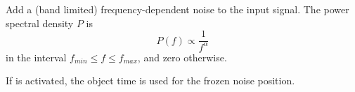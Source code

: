 Add a (band limited) frequency-dependent noise to the input
signal. The power spectral density $P$ is
\begin{equation}
P(f) \propto \frac{1}{f^\alpha}
\end{equation}
in the interval $f_{min} \le f \le f_{max}$, and zero otherwise.



If  is activated, the object time is used for the
frozen noise position.



